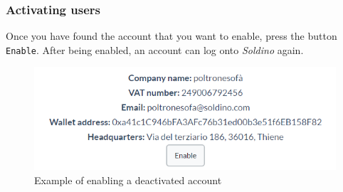 		\subsubsection{Activating users}
		Once you have found the account that you want to enable, press the
		button \texttt{Enable}. After being enabled, an account can log onto 
		\textit{Soldino} again.
		\begin{figure}[H]
			\includegraphics[width=15cm]{res/images/user_enable.png}
			\centering
			\caption{Example of enabling a deactivated account}
		\end{figure}
